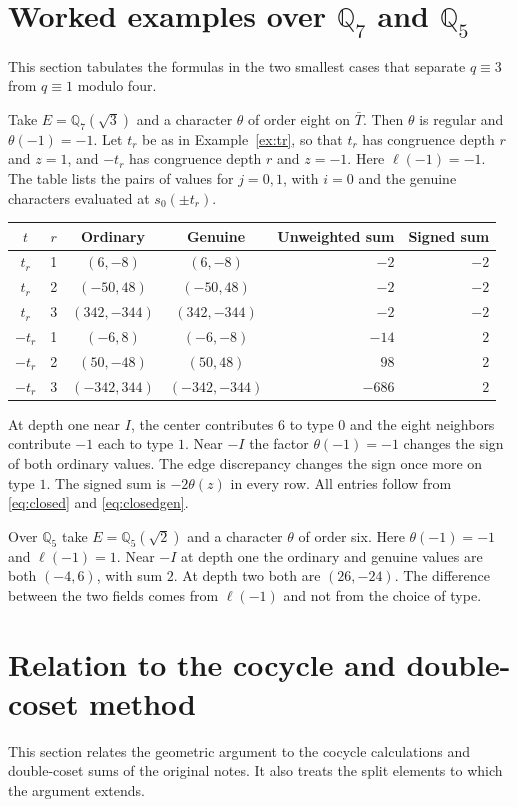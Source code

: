 \documentclass[12pt,letterpaper]{article}
\numberwithin{equation}{section}
\theoremstyle{definition}
\theoremstyle{remark}
\begin{document}
\section{Worked examples over \texorpdfstring{$\mathbb Q_7$ and $\mathbb Q_5$}{Q7 and Q5}}\label{sec:examples}
This section tabulates the formulas in the two smallest cases that separate $q\equiv3$ from $q\equiv1$ modulo four.

Take $E=\mathbb Q_7(\sqrt3)$ and a character $\theta$ of order eight on $\bar T$. Then $\theta$ is regular and $\theta(-1)=-1$. Let $t_r$ be as in Example~\ref{ex:tr}, so that $t_r$ has congruence depth $r$ and $z=1$, and $-t_r$ has congruence depth $r$ and $z=-1$. Here $\ell(-1)=-1$. The table lists the pairs of values for $j=0,1$, with $i=0$ and the genuine characters evaluated at $s_0(\pm t_r)$.

\begin{center}
\small
\begin{tabular}{ccccrr}
\toprule
$t$ & $r$ & Ordinary & Genuine & Unweighted sum & Signed sum\\
\midrule
$t_r$ &1& $(6,-8)$ & $(6,-8)$ & $-2$ & $-2$\\
$t_r$ &2& $(-50,48)$ & $(-50,48)$ & $-2$ & $-2$\\
$t_r$ &3& $(342,-344)$ & $(342,-344)$ & $-2$ & $-2$\\
$-t_r$ &1& $(-6,8)$ & $(-6,-8)$ & $-14$ & $2$\\
$-t_r$ &2& $(50,-48)$ & $(50,48)$ & $98$ & $2$\\
$-t_r$ &3& $(-342,344)$ & $(-342,-344)$ & $-686$ & $2$\\
\bottomrule
\end{tabular}
\end{center}
At depth one near $I$, the center contributes $6$ to type $0$ and the eight neighbors contribute $-1$ each to type $1$. Near $-I$ the factor $\theta(-1)=-1$ changes the sign of both ordinary values. The edge discrepancy changes the sign once more on type $1$. The signed sum is $-2\theta(z)$ in every row. All entries follow from \eqref{eq:closed} and \eqref{eq:closedgen}.

Over $\mathbb Q_5$ take $E=\mathbb Q_5(\sqrt2)$ and a character $\theta$ of order six. Here $\theta(-1)=-1$ and $\ell(-1)=1$. Near $-I$ at depth one the ordinary and genuine values are both $(-4,6)$, with sum $2$. At depth two both are $(26,-24)$. The difference between the two fields comes from $\ell(-1)$ and not from the choice of type.

\section{Relation to the cocycle and double-coset method}\label{sec:old}
This section relates the geometric argument to the cocycle calculations and double-coset sums of the original notes. It also treats the split elements to which the argument extends.
\end{document}
